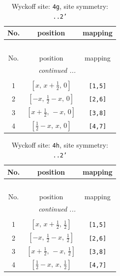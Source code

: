 \documentclass[fleqn,8pt]{jsarticle}
\begin{document}
\renewcommand{\arraystretch}{1.2}
\begin{longtable}{ccc}
\caption{Wyckoff site: {\tt 4g}, site symmetry: {\tt ..2'}}
 \\
 \hline \hline
No. & position & mapping \\ \hline \endfirsthead

\multicolumn{2}{l}{\tablename\ \thetable{}} \\
 \hline \hline
No. & position & mapping \\ \hline \endhead

 \hline \hline
\multicolumn{2}{r}{\footnotesize\it continued ...} \\ \endfoot

 \hline \hline
\multicolumn{2}{r}{} \\ \endlastfoot

1 & $\left[ x,\, x + \frac{1}{2},\, 0 \right]$ & {\tt [1,5]} \\ \hline
2 & $\left[ - x,\, \frac{1}{2} - x,\, 0 \right]$ & {\tt [2,6]} \\ \hline
3 & $\left[ x + \frac{1}{2},\, - x,\, 0 \right]$ & {\tt [3,8]} \\ \hline
4 & $\left[ \frac{1}{2} - x,\, x,\, 0 \right]$ & {\tt [4,7]} \\
\end{longtable}
\renewcommand{\arraystretch}{1.2}
\begin{longtable}{ccc}
\caption{Wyckoff site: {\tt 4h}, site symmetry: {\tt ..2'}}
 \\
 \hline \hline
No. & position & mapping \\ \hline \endfirsthead

\multicolumn{2}{l}{\tablename\ \thetable{}} \\
 \hline \hline
No. & position & mapping \\ \hline \endhead

 \hline \hline
\multicolumn{2}{r}{\footnotesize\it continued ...} \\ \endfoot

 \hline \hline
\multicolumn{2}{r}{} \\ \endlastfoot

1 & $\left[ x,\, x + \frac{1}{2},\, \frac{1}{2} \right]$ & {\tt [1,5]} \\ \hline
2 & $\left[ - x,\, \frac{1}{2} - x,\, \frac{1}{2} \right]$ & {\tt [2,6]} \\ \hline
3 & $\left[ x + \frac{1}{2},\, - x,\, \frac{1}{2} \right]$ & {\tt [3,8]} \\ \hline
4 & $\left[ \frac{1}{2} - x,\, x,\, \frac{1}{2} \right]$ & {\tt [4,7]} \\
\end{longtable}
\end{document}
